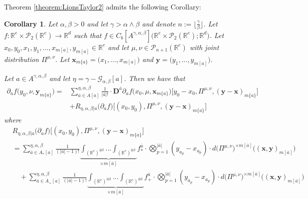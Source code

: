 \documentclass[a4paper,11pt,twoside]{article}
\numberwithin{equation}{section}
\theoremstyle{plain}
\newtheorem{corollary}[theorem]{Corollary}
\newcommand{\bR}{\mathbb{R}}
\newcommand{\cP}{\mathcal{P}}
\newcommand{\scG}{\mathscr{G}}
\newcommand{\rD}{\mathbf{D}}
\newcommand{\1}{\mathbbm{1}}
\begin{document}
	Theorem \ref{theorem:LionsTaylor2} admits the following Corollary:
	\begin{corollary}
		\label{corollary:LionsTaylor2}
		Let $\alpha, \beta>0$ and let $\gamma>\alpha\wedge\beta$ and denote $n:=\big\lfloor \tfrac{\gamma}{\beta} \big\rfloor$. Let $f: \bR^e \times \cP_2(\bR^e) \to \bR^d$ such that $f\in C_b[A^{\gamma, \alpha, \beta}]\big( \bR^e \times \cP_2(\bR^e); \bR^d\big)$. Let $x_0, y_0, x_1, y_1, ..., x_{m[a]}, y_{m[a]} \in \bR^e$ and let $\mu,\nu\in \cP_{n+1}(\bR^e)$ with joint distribution $\Pi^{\mu, \nu}$. Let $\boldsymbol{x}_{m\{a\}} = \big( x_1, ..., x_{m[a]}\big)$ and $\boldsymbol{y} = \big( y_1, ..., y_{m[a]} \big)$. 
		
		Let $a\in A^{\gamma, \alpha, \beta}$ and let $\eta = \gamma - \scG_{\alpha, \beta}[a]$. Then we have that
		\begin{align}
			\nonumber
			\partial_a f\Big( y_0, \nu, \boldsymbol{y}_{m\{a\}}\Big)
			=& 
			\sum_{\overline{a}\in A[a]}^{\eta, \alpha, \beta} \frac{1}{|\overline{a}|!}\cdot \rD^{\overline{a}} \partial_a f\Big( x_0, \mu, \boldsymbol{x}_{m\{a\}} \Big) \Big[ y_0 - x_0, \Pi^{\mu, \nu}, (\boldsymbol{y} - \boldsymbol{x})_{m\{a\}} \Big]
			\\
			&+
			R_{\eta, \alpha, \beta|a}\Big( \partial_a f\Big)\Big[ (x_0, y_0), \Pi^{\mu, \nu}, (\boldsymbol{y} - \boldsymbol{x})_{m\{a\}} \Big]
		\end{align}
		where
		\begin{align}
			\nonumber
			&R_{\eta, \alpha, \beta|a}\Big( \partial_a f\Big)\Big[ (x_0, y_0), \Pi^{\mu, \nu}, (\boldsymbol{y} - \boldsymbol{x})_{m\{a\}} \Big]
			\\
			\nonumber
			&= 
			\sum_{\overline{a} \in A_{\ast}[a]}^{\eta, \alpha, \beta} \tfrac{1}{(|\overline{a}| - 1)!} \underbrace{ \int_{(\bR^e)^{\oplus 2}} ... \int_{(\bR^e)^{\oplus 2}} }_{\times m[\overline{a}]} f_{\ast}^{\overline{a}}
			\cdot 
			\bigotimes_{p=1}^{|\overline{a}|} ( y_{a_p} - x_{a_p}) \cdot d\big( \Pi^{\mu, \nu}\big)^{\times m[\overline{a}]} \Big( (\boldsymbol{x}, \boldsymbol{y})_{m[\overline{a}]}\Big)
			\\
			\nonumber
			&\quad + \sum_{\overline{a} \in A_{+}[a]}^{\eta, \alpha, \beta} \tfrac{1}{(|\overline{a}| - 1)!} \underbrace{ \int_{(\bR^e)^{\oplus 2}} ... \int_{(\bR^e)^{\oplus 2}} }_{\times m[\overline{a}]} f_{+}^{\overline{a}}
			\cdot 
			\bigotimes_{p=1}^{|\overline{a}|} ( y_{a_p} - x_{a_p}) \cdot d\big( \Pi^{\mu, \nu}\big)^{\times m[\overline{a}]} \Big( (\boldsymbol{x}, \boldsymbol{y})_{m[\overline{a}]}\Big)
			\\

\end{align}
\end{corollary}
\end{document}
